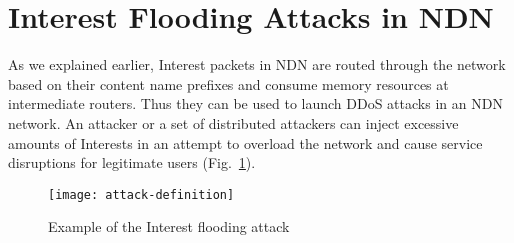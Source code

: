 \section{Interest Flooding Attacks in NDN}
\label{sec:interest-flooding}




As we explained earlier, Interest packets in NDN are routed through the network based on their content name prefixes and consume memory resources at intermediate routers. Thus they can be used to launch DDoS attacks in an NDN network. An attacker or a set of distributed attackers can inject excessive amounts of Interests in an attempt to overload the network and cause service disruptions for legitimate users (Fig.~\ref{fig:flooding example}). 

\begin{figure}[htbp]
  \centering
  \texttt{[image: attack-definition]}
  \vspace{-0.4cm}
  \caption{Example of the Interest flooding attack}
  \label{fig:flooding example}
\end{figure}


